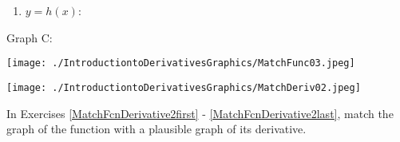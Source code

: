 \documentclass{ximera}
\begin{document}
\begin{center}
\begin{multicols}{2}
\begin{enumerate}
\item \label{MatchFcnDerivative1last} $y = h(x)$:

\setcounter{HW}{\value{enumi}}
\end{enumerate}


Graph C:

\end{multicols}




\begin{multicols}{2}

\texttt{[image: ./IntroductiontoDerivativesGraphics/MatchFunc03.jpeg]}

\texttt{[image: ./IntroductiontoDerivativesGraphics/MatchDeriv02.jpeg]}

\end{multicols}


\end{center}

In Exercises \ref{MatchFcnDerivative2first} - \ref{MatchFcnDerivative2last}, match the graph of the function with a plausible graph of its derivative.
\end{document}

